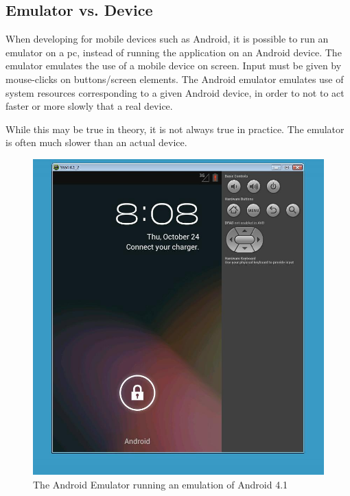 \subsection{Emulator vs. Device}
\label{sec:emulatorvsdevice}
When developing for mobile devices such as Android, it is possible to run an emulator on a pc, instead of running the application on an Android device. The emulator emulates the use of a mobile device on screen. Input must be given by mouse-clicks on buttons/screen elements. The Android emulator emulates use of system resources corresponding to a given Android device, in order to not to act faster or more slowly that a real device. 

While this may be true in theory, it is not always true in practice. The emulator is often much slower than an actual device.


\begin{figure}
\begin{center}
\includegraphics[scale=0.4]{Pictures/app-screenshots/androidemulator.png}
\end{center}
\caption{The Android Emulator running an emulation of Android 4.1}
\label{fig:androidemulator}
\end{figure}

